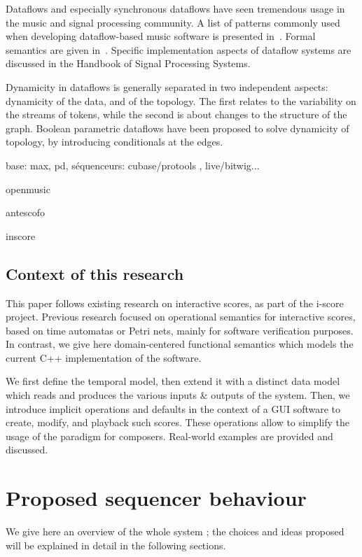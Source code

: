 \documentclass{article}
\begin{document}
Dataflows and especially synchronous dataflows have seen tremendous usage in the music and signal processing community. 
A list of patterns commonly used when developing dataflow-based music software is presented in~\cite{arumi2006dataflow}.
Formal semantics are given in~\cite{benveniste_data-flow_1993}.
Specific implementation aspects of dataflow systems are discussed in the Handbook of Signal Processing Systems\cite{bhattacharyya_handbook_2013}. 

Dynamicity in dataflows is generally separated in two independent aspects: dynamicity of the data, and of the topology.
The first relates to the variability on the streams of tokens, while the second is about changes to the structure of the graph. 
Boolean parametric dataflows\cite{bempelis2015boolean} have been proposed to solve dynamicity of topology, by introducing conditionals at the edges.

base: max, pd, séquenceurs: cubase/protools , live/bitwig...

openmusic

antescofo

inscore


\subsection{Context of this research}
This paper follows existing research on interactive scores, as part of the i-score project.
Previous research focused on operational semantics for interactive scores, based on time automatas\cite{arias2016authoring} or Petri nets\cite{allombert2007system}, mainly for software verification purposes. 
In contrast, we give here domain-centered functional semantics which models the current C++ implementation of the software.

We first define the temporal model, then extend it with a distinct data model which reads and produces the various inputs \& outputs of the system. 
Then, we introduce implicit operations and defaults in the context of a GUI software to create, modify, and playback such scores. These operations allow to simplify the usage of the paradigm for composers.
Real-world examples are provided and discussed.

\cite{celerier2017icmc}

\section{Proposed sequencer behaviour}
We give here an overview of the whole system ; the choices and ideas proposed will be explained in detail in the following sections.
\end{document}
